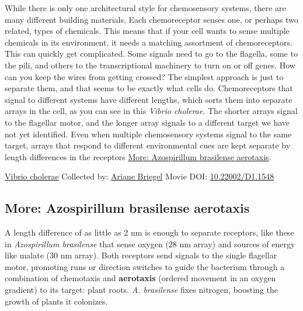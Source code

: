 \documentclass[]{tufte-book}
\begin{document}
While there is only one architectural style for chemosensory systems, there are many different building materials. Each chemoreceptor senses one, or perhaps two related, types of chemicals. This means that if your cell wants to sense multiple chemicals in its environment, it needs a matching assortment of chemoreceptors. This can quickly get complicated. Some signals need to go to the flagella, some to the pili, and others to the transcriptional machinery to turn on or off genes. How can you keep the wires from getting crossed? The simplest approach is just to separate them, and that seems to be exactly what cells do. Chemoreceptors that signal to different systems have different lengths, which sorts them into separate arrays in the cell, as you can see in this \emph{Vibrio cholerae}. The shorter arrays signal to the flagellar motor, and the longer array signals to a different target we have not yet identified. Even when multiple chemosensory systems signal to the same target, arrays that respond to different environmental cues are kept separate by length differences in the receptors \protect\hyperlink{Azospirillum_brasilense_aerotaxis}{More: Azospirillum brasilense aerotaxis}.



\hypertarget{htmlwidget-6e4fa2b818380fb9b2da}{}

\label{fig:7-4}\protect\hyperlink{tree}{Vibrio cholerae} Collected by: \protect\hyperlink{ariane_briegel}{Ariane Briegel} Movie DOI: \href{https://doi.org/10.22002/D1.1548}{10.22002/D1.1548}

\hypertarget{Azospirillum_brasilense_aerotaxis}{%
\subsection*{More: Azospirillum brasilense aerotaxis}\label{Azospirillum_brasilense_aerotaxis}}

A length difference of as little as 2 nm is enough to separate receptors, like these in \emph{Azospirillum brasilense} that sense oxygen (28 nm array) and sources of energy like malate (30 nm array). Both receptors send signals to the single flagellar motor, promoting runs or direction switches to guide the bacterium through a combination of chemotaxis and \textbf{aerotaxis} (ordered movement in an oxygen gradient) to its target: plant roots. \emph{A. brasilense} fixes nitrogen, boosting the growth of plants it colonizes.
\end{document}
